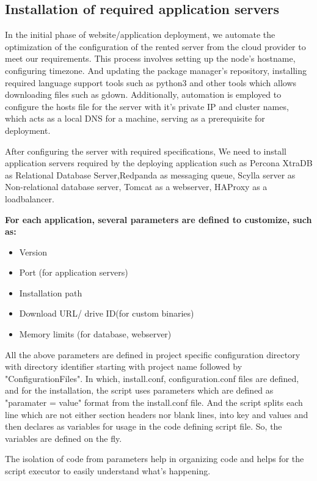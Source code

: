 \documentclass[12pt,a4paper,oneside]{report}
\begin{document}
\subsection{Installation of required application servers}
\par\hspace{1cm} 
In the initial phase of website/application deployment, we automate the optimization of the configuration of the rented server from the cloud provider to meet our requirements. This process involves setting up the node's hostname, configuring timezone. And updating the package manager's repository, installing required language support tools such as python3 and other tools which allows downloading files such as gdown. Additionally, automation is employed to configure the hosts file for the server with it's private IP and cluster names, which acts as a local DNS for a machine, serving as a prerequisite for deployment.
 \par\hspace{1cm} After configuring the server with required specifications, We need to install application servers required by the deploying application such as Percona XtraDB as Relational Database Server,Redpanda as messaging queue, Scylla server as Non-relational database server, Tomcat as a webserver, HAProxy as a loadbalancer. 
\par\textbf{For each application, several parameters are defined to customize, such as:}
\begin{itemize}
	\item Version
	\item Port (for application servers)
	\item Installation path
	\item Download URL/ drive ID(for custom binaries)
	\item Memory limits (for database, webserver)
\end{itemize}
\par\hspace{1cm} All the above parameters are defined in project specific configuration directory with directory identifier starting with project name followed by "ConfigurationFiles". In which, install.conf, configuration.conf files are defined, and for the installation, the script uses parameters which are defined as "paramater = value" format from the install.conf file. And the script splits each line which are not either section headers nor blank lines, into key and values and then declares as variables for usage in the code defining script file. So, the variables are defined on the fly.
\par\hspace{1cm} The isolation of code from parameters help in organizing code and helps for the script executor to easily understand what's happening.
\end{document}
